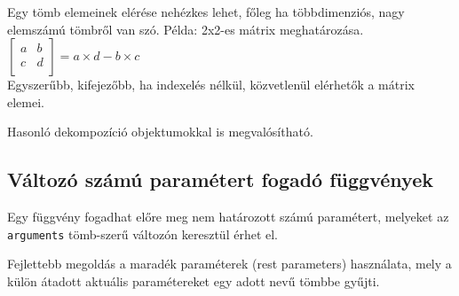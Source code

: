 \begin{frame}
  Egy tömb elemeinek elérése nehézkes lehet, főleg ha többdimenziós, nagy elemszámú tömbről van szó. Példa: 2x2-es mátrix  meghatározása.\\
  $\left[ \begin{array}{cc} a & b \\ c & d \\ \end{array} \right] = a\times d - b\times c$ \\
  Egyszerűbb, kifejezőbb, ha indexelés nélkül, közvetlenül elérhetők a mátrix elemei.
  \footnotesize
  \begin{exampleblock}{}
    
  \end{exampleblock}
\end{frame}

\begin{frame}
  Hasonló dekompozíció objektumokkal is megvalósítható.
  \footnotesize
  \begin{exampleblock}{}
    
  \end{exampleblock}
\end{frame}

\subsection{Változó számú paramétert fogadó függvények}

\begin{frame}
  Egy függvény fogadhat előre meg nem határozott számú paramétert, melyeket az \texttt{arguments} tömb-szerű változón keresztül érhet el.
  \begin{exampleblock}{}
    
  \end{exampleblock}
\end{frame}

\begin{frame}
  Fejlettebb megoldás a maradék paraméterek (rest parameters) használata, mely a külön átadott aktuális paramétereket egy adott nevű tömbbe gyűjti.
  \begin{exampleblock}{}
    
  \end{exampleblock}
\end{frame}

